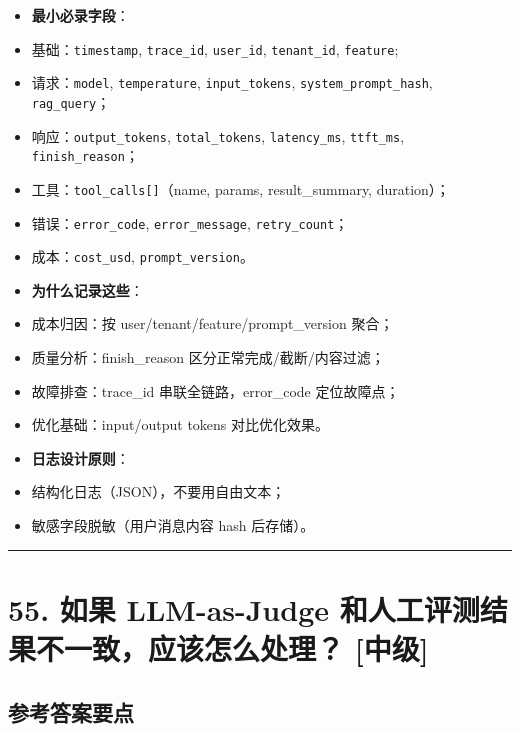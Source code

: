 \documentclass[9pt,a4paper,twocolumn]{ctexart}
\newcommand{\lvzhong}{\usebox{\badgezhongbox}}
\def\lvzhong{[中级]}%
\begin{document}
\begin{itemize}[itemsep=1pt, topsep=2pt]
  \item \textbf{最小必录字段}：
  \item 基础：\texttt{timestamp}, \texttt{trace\_id}, \texttt{user\_id}, \texttt{tenant\_id}, \texttt{feature};
  \item 请求：\texttt{model}, \texttt{temperature}, \texttt{input\_tokens}, \texttt{system\_prompt\_hash}, \texttt{rag\_query}；
  \item 响应：\texttt{output\_tokens}, \texttt{total\_tokens}, \texttt{latency\_ms}, \texttt{ttft\_ms}, \texttt{finish\_reason}；
  \item 工具：\texttt{tool\_calls[]}（name, params, result\_summary, duration）；
  \item 错误：\texttt{error\_code}, \texttt{error\_message}, \texttt{retry\_count}；
  \item 成本：\texttt{cost\_usd}, \texttt{prompt\_version}。
  \item \textbf{为什么记录这些}：
  \item 成本归因：按 user/tenant/feature/prompt\_version 聚合；
  \item 质量分析：finish\_reason 区分正常完成/截断/内容过滤；
  \item 故障排查：trace\_id 串联全链路，error\_code 定位故障点；
  \item 优化基础：input/output tokens 对比优化效果。
  \item \textbf{日志设计原则}：
  \item 结构化日志（JSON），不要用自由文本；
  \item 敏感字段脱敏（用户消息内容 hash 后存储）。
\end{itemize}


\vspace{2pt}
\noindent\rule{\columnwidth}{0.3pt}\vspace{2pt}



\section*{55. 如果 LLM-as-Judge 和人工评测结果不一致，应该怎么处理？ \lvzhong{}}


\subsection*{参考答案要点}
\end{document}
